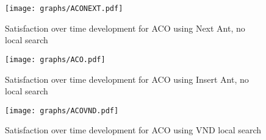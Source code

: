 \documentclass{article}
\begin{document}
\clearpage





\begin{figure}
\centering
\texttt{[image: graphs/ACONEXT.pdf]}
\caption{Satisfaction over time development for ACO using Next Ant, no local search}
\label{fig:ACONEXT}
\end{figure}

\begin{figure}
\centering
\texttt{[image: graphs/ACO.pdf]}
\caption{Satisfaction over time development for ACO using Insert Ant, no local search}
\label{fig:ACO}
\end{figure}

\begin{figure}
\centering
\texttt{[image: graphs/ACOVND.pdf]}
\caption{Satisfaction over time development for ACO using VND local search}
\label{fig:vnd}
\end{figure}
\end{document}
